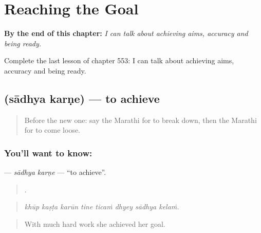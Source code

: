 
\chapter{Reaching the Goal}
\label{ch:mr-reaching-the-goal}

\begin{chapteropening}
\textbf{By the end of this chapter:} \emph{I can talk about achieving aims, accuracy and being ready.}

Complete the last lesson of chapter 553: I can talk about achieving aims, accuracy and being ready.
\end{chapteropening}

\section[\texorpdfstring{\mr{साध्य} \mr{करणे} (sādhya karṇe)}{साध्य करणे (sādhya karṇe)}]{  (sādhya karṇe) — to achieve}

\label{lesson:MR-C553-sadhya-karne}



\begin{quote}
Before the new one: say the Marathi for to break down, then the Marathi for to come loose.
\end{quote}

\subsection*{You'll want to know:  }
\textbf{ } — \emph{sādhya karṇe} — \textquotedblleft{}to achieve\textquotedblright{}.

\begin{quote}
       .
\end{quote}

\begin{quote}
\emph{khūp kaṣṭa karūn tine ticaṁ dhyey sādhya kelaṁ.}
\end{quote}

\begin{quote}
With much hard work she achieved her goal.
\end{quote}

